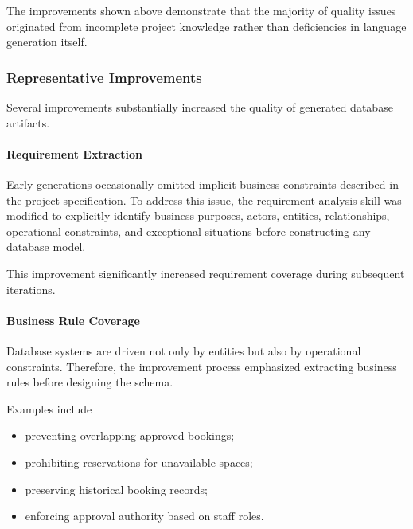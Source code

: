 The improvements shown above demonstrate that the majority of quality issues originated from incomplete project knowledge rather than deficiencies in language generation itself.

\subsubsection{Representative Improvements}

Several improvements substantially increased the quality of generated database artifacts.

\paragraph{Requirement Extraction}

Early generations occasionally omitted implicit business constraints described in the project specification. To address this issue, the requirement analysis skill was modified to explicitly identify business purposes, actors, entities, relationships, operational constraints, and exceptional situations before constructing any database model.

This improvement significantly increased requirement coverage during subsequent iterations.

\paragraph{Business Rule Coverage}

Database systems are driven not only by entities but also by operational constraints. Therefore, the improvement process emphasized extracting business rules before designing the schema.

Examples include

\begin{itemize}

	\item preventing overlapping approved bookings;

	\item prohibiting reservations for unavailable spaces;

	\item preserving historical booking records;

	\item enforcing approval authority based on staff roles.

\end{itemize}

